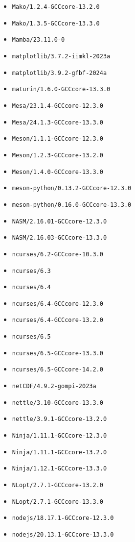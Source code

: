 \begin{multicols}{3}
\begin{itemize}
\item \verb|Mako/1.2.4-GCCcore-13.2.0|
\item \verb|Mako/1.3.5-GCCcore-13.3.0|
\item \verb|Mamba/23.11.0-0|
\item \verb|matplotlib/3.7.2-iimkl-2023a|
\item \verb|matplotlib/3.9.2-gfbf-2024a|
\item \verb|maturin/1.6.0-GCCcore-13.3.0|
\item \verb|Mesa/23.1.4-GCCcore-12.3.0|
\item \verb|Mesa/24.1.3-GCCcore-13.3.0|
\item \verb|Meson/1.1.1-GCCcore-12.3.0|
\item \verb|Meson/1.2.3-GCCcore-13.2.0|
\item \verb|Meson/1.4.0-GCCcore-13.3.0|
\item \verb|meson-python/0.13.2-GCCcore-12.3.0|
\item \verb|meson-python/0.16.0-GCCcore-13.3.0|
\item \verb|NASM/2.16.01-GCCcore-12.3.0|
\item \verb|NASM/2.16.03-GCCcore-13.3.0|
\item \verb|ncurses/6.2-GCCcore-10.3.0|
\item \verb|ncurses/6.3|
\item \verb|ncurses/6.4|
\item \verb|ncurses/6.4-GCCcore-12.3.0|
\item \verb|ncurses/6.4-GCCcore-13.2.0|
\item \verb|ncurses/6.5|
\item \verb|ncurses/6.5-GCCcore-13.3.0|
\item \verb|ncurses/6.5-GCCcore-14.2.0|
\item \verb|netCDF/4.9.2-gompi-2023a|
\item \verb|nettle/3.10-GCCcore-13.3.0|
\item \verb|nettle/3.9.1-GCCcore-13.2.0|
\item \verb|Ninja/1.11.1-GCCcore-12.3.0|
\item \verb|Ninja/1.11.1-GCCcore-13.2.0|
\item \verb|Ninja/1.12.1-GCCcore-13.3.0|
\item \verb|NLopt/2.7.1-GCCcore-13.2.0|
\item \verb|NLopt/2.7.1-GCCcore-13.3.0|
\item \verb|nodejs/18.17.1-GCCcore-12.3.0|
\item \verb|nodejs/20.13.1-GCCcore-13.3.0|

\end{itemize}
\end{multicols}
